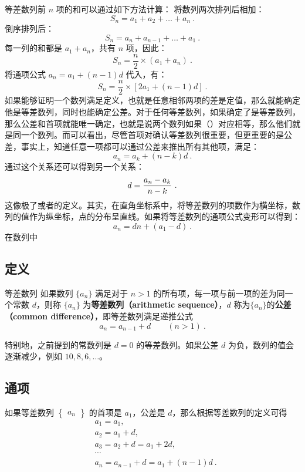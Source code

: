 等差数列前 $n$ 项的和可以通过如下方法计算：  
将数列两次排列后相加：
\[
S_n = a_1 + a_2 + \dots + a_n
~.\]
倒序排列后：
\[
S_n = a_n + a_{n-1} + \dots + a_1
~.\]
每一列的和都是 $a_1 + a_n$，共有 $n$ 项，因此：
\[
S_n = \frac{n}{2} \times (a_1 + a_n)
~.\]
将通项公式 $a_n = a_1 + (n-1)d$ 代入，有：
\[
S_n = \frac{n}{2} \times [2a_1 + (n-1)d]
~.\]
如果能够证明一个数列满足定义，也就是任意相邻两项的差是定值，那么就能确定他是等差数列，同时也能确定公差。对于任何等差数列，如果确定了是等差数列，那么公差和首项就能唯一确定，也就是说两个数列如果（）对应相等，那么他们就是同一个数列。而可以看出，尽管首项对确认等差数列很重要，但更重要的是公差，事实上，知道任意一项都可以通过公差来推出所有其他项，满足：
\begin{equation}
a_n=a_k+(n-k)d~.
\end{equation}
通过这个关系还可以得到另一个关系：
\begin{equation}
d={a_n-a_k\over n-k}~.
\end{equation}
这像极了或者的定义。其实，在直角坐标系中，将等差数列的项数作为横坐标，数列的值作为纵坐标，点的分布呈直线。如果将等差数列的通项公式变形可以得到：
\begin{equation}
a_n=dn+(a_1-d)~.
\end{equation}
在数列中

\subsection{定义}

\begin{definition}{等差数列}
如果数列 $\{a_n\}$ 满足对于 $n > 1$ 的所有项，每一项与前一项的差为同一个常数 $d$，则称 $\{a_n\}$ 为\textbf{等差数列（arithmetic sequence）}，$d$ 称为$\{a_n\}$的\textbf{公差（common difference）}，即等差数列满足递推公式
\begin{equation}
a_{n}=a_{n-1}+d\qquad(n>1)~.
\end{equation}
\end{definition}

特别地，之前提到的常数列是 $d = 0$ 的等差数列。如果公差 $d$ 为负，数列的值会逐渐减少，例如 $10, 8, 6, \dots$。

\subsection{通项}
如果等差数列 $\begin{Bmatrix} a_n \end{Bmatrix}$ 的首项是 $a_1$，公差是 $d$，那么根据等差数列的定义可得
\begin{equation}
\begin{aligned}
&a_1 = a_1,\\
&a_2 = a_1 + d,\\
&a_3 = a_2 + d = a_1 + 2d,\\
&\cdots \\
&a_n = a_{n-1} + d = a_1 + (n - 1)d~.
\end{aligned}
\end{equation}

